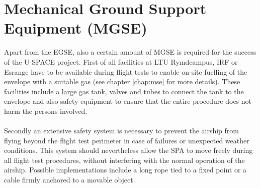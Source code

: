 \section{Mechanical Ground Support Equipment (MGSE)}

Apart from the \ac{EGSE}, also a certain amount of \ac{MGSE} is required for the success of the \ac{U-SPACE} project. First of all facilities at \ac{LTU} Rymdcampus, \ac{IRF} or Esrange have to be available during flight tests to enable on-site fuelling of the envelope with a suitable gas (see chapter \ref{chap:mse} for more details). These facilities include a large gas tank, valves and tubes to connect the tank to the envelope and also safety equipment to ensure that the entire procedure does not harm the persons involved.
\\
\\
Secondly an extensive safety system is necessary to prevent the airship from flying beyond the flight test perimeter in case of failures or unexpected weather conditions. This system should nevertheless allow the \ac{SPA} to move freely during all flight test procedures, without interfering with the normal operation of the airship. Possible implementations include a long rope tied to a fixed point or a cable firmly anchored to a movable object.